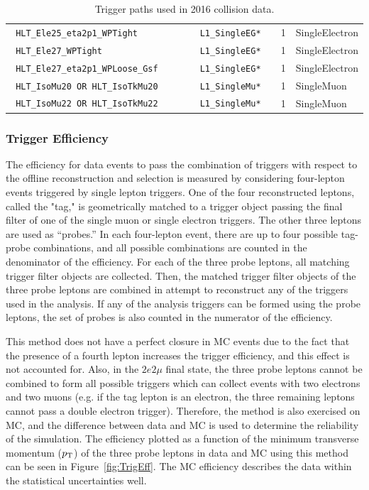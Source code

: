 \begin{table}[h]
\begin{tabular}{|l|l|c|l|}
\verb| HLT_Ele25_eta2p1_WPTight                        | & \verb| L1_SingleEG*         |  & 1 & SingleElectron \\
\verb| HLT_Ele27_WPTight                               | & \verb| L1_SingleEG*         |  & 1 & SingleElectron \\
\verb| HLT_Ele27_eta2p1_WPLoose_Gsf                    | & \verb| L1_SingleEG*         |  & 1 & SingleElectron \\
\verb| HLT_IsoMu20 OR HLT_IsoTkMu20                    | & \verb| L1_SingleMu*         |  & 1 & SingleMuon \\
\verb| HLT_IsoMu22 OR HLT_IsoTkMu22                    | & \verb| L1_SingleMu*         |  & 1 & SingleMuon \\
\hline %
    \end{tabular}
    \caption{Trigger paths used in 2016 collision data.}
    \label{tab:triggerPaths}
\end{table}


\subsubsection{Trigger Efficiency}

The efficiency for data events to pass the combination of triggers with respect to the offline reconstruction and selection is measured
by considering four-lepton events triggered by single lepton triggers. One of the four reconstructed leptons, called the "tag," is geometrically matched 
to a trigger object passing the final filter of one of the single muon or single electron triggers. The other three leptons are 
used as ``probes.'' In each four-lepton event, there are up to four possible tag-probe combinations, and all possible combinations are counted in the
denominator of the efficiency. For each of the three probe leptons, all matching trigger filter objects are collected. Then, the matched trigger filter
objects of the three probe leptons are combined in attempt to reconstruct any of the triggers used in the analysis. If any of the analysis triggers
can be formed using the probe leptons, the set of probes is also counted in the numerator of the efficiency.

This method does not have a perfect closure in MC events due to the fact that the presence of a fourth lepton increases the trigger efficiency,
and this effect is not accounted for. Also, in the  $2e2\mu$ final state, the three probe leptons cannot be combined to form all possible triggers which 
can collect events with two electrons and two muons (e.g. if the tag lepton is an electron, the three remaining leptons cannot pass a double electron
trigger). Therefore, the method is also exercised on MC, and the difference between data and MC is used to determine the reliability of the simulation.
 The efficiency plotted as a function of the minimum transverse momentum ($p_{\rm{T}}$) of the three probe leptons in data and MC using this method can be seen in 
Figure~\ref{fig:TrigEff}. The MC efficiency describes the data within the statistical uncertainties well.

